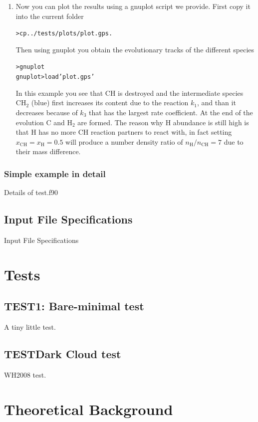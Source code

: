 \documentclass[10pt]{article}
\begin{document}
\begin{enumerate}
	\item Now you can plot the results using a gnuplot script we provide. First copy it into the current folder
	\begin{alltt}
		> cp ../tests/plots/plot.gps .
	\end{alltt}
	Then using gnuplot you obtain the evolutionary tracks of the different species
	\begin{alltt}
		> gnuplot
		gnuplot> load 'plot.gps'
	\end{alltt}
	In this example you see that CH is destroyed and the intermediate species CH$_2$ (blue) first increases its content due to the reaction $k_1$, and than it decreases because of $k_3$ that has the largest rate coefficient. At the end of the evolution
C and H$_2$ are formed. The reason why H abundance is still high is that H has no more CH reaction partners to react with, in fact setting
$x_\mathrm{CH}=x_\mathrm{H}=0.5$ will produce a number density ratio of $n_\mathrm{H}/n_\mathrm{CH}=7$ due to their mass difference.
\end{enumerate}

\subsubsection{Simple example in detail}\label{sssect:detail_simple_example}
Details of test.f90

\subsection{Input File Specifications}\label{sect:input_file_specifications}
Input File Specifications

\section{Tests}
\subsection{TEST1: Bare-minimal test}
A tiny little test.
\subsection{TESTDark Cloud test}
WH2008 test.


\section{Theoretical Background}
\end{document}
